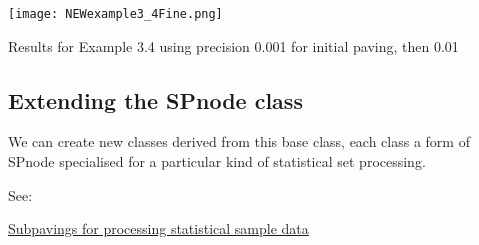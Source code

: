  
\begin{DoxyImage}
\texttt{[image: NEWexample3\_4Fine.png]}
\caption{\-Results for \-Example 3.4 using precision 0.001 for initial paving, then 0.01}
\end{DoxyImage}




\hypertarget{newsubpavings_newsec_extension}{}\subsection{\-Extending the S\-Pnode class}\label{newsubpavings_newsec_extension}
\-We can create new classes derived from this base class, each class a form of \-S\-Pnode specialised for a particular kind of statistical set processing.

\-See\-:
\begin{DoxyItemize}
\item \hyperlink{StatsSubPavings}{\-Subpavings for processing statistical sample data} 
\end{DoxyItemize}